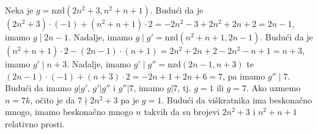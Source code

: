 \documentclass{exam}
\begin{document}
\begin{questions}
\begin{solution}
  Neka je $g = \text{nzd}(2n^2 + 3, n^2 + n + 1)$. Budući da je $(2n^2 + 3) \cdot (-1) + (n^2 + n + 1) \cdot 2 = -2n^2 - 3 + 2n^2 + 2n + 2 = 2n - 1$, imamo $g \mid 2n - 1$. Nadalje, imamo $g \mid g' = \text{nzd}(n^2 + n + 1, 2n - 1)$. Budući da je $(n^2 + n + 1) \cdot 2 - (2n - 1) \cdot (n + 1) = 2n^2 + 2n + 2 - 2n^2 - n + 1 = n + 3$, imamo $g' \mid n + 3$. Nadalje, imamo $g' \mid g'' = \text{nzd}(2n - 1, n + 3)$ te $(2n - 1) \cdot (-1) + (n + 3) \cdot 2 = -2n + 1 + 2n + 6 = 7$, pa imamo $g'' \mid 7$. Budući da imamo $g |g'$, $g' | g''$ i $g'' | 7$, imamo $g | 7$, tj. $g = 1$ ili $g = 7$.
  Ako uzmemo $n = 7k$, očito je da $7 \nmid 2n^2 + 3$ pa je $g = 1$. Budući da viškratnika ima beskonačno mnogo, imamo beskonačno mnogo $n$ takvih da su brojevi $2n^2 + 3$ i $n^2 + n + 1$ relativno prosti.
\end{solution}

\end{questions}
\end{document}
